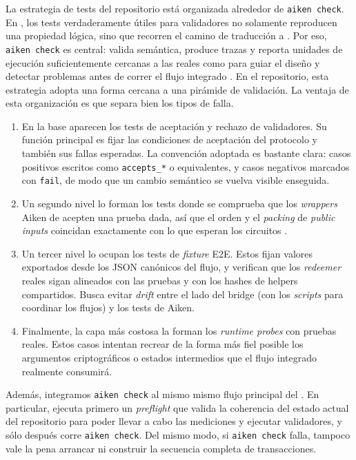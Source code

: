 La estrategia de tests del repositorio está organizada alrededor de \texttt{aiken check}. En \Cardano, los tests verdaderamente útiles para validadores no solamente reproducen una propiedad lógica, sino que recorren el camino de traducción a \UPLC. Por eso, \texttt{aiken check} es central: valida semántica, produce trazas y reporta unidades de ejecución suficientemente cercanas a las reales como para guiar el diseño y detectar problemas antes de correr el flujo integrado \cite{aiken2026}. En el repositorio, esta estrategia adopta una forma cercana a una pirámide de validación. La ventaja de esta organización es que separa bien los tipos de falla.

\begin{enumerate}[noitemsep]
  \item En la base aparecen los tests de aceptación y rechazo de validadores. Su función principal es fijar las condiciones de aceptación del protocolo y también sus fallas esperadas. La convención adoptada es bastante clara: casos positivos escritos como \texttt{accepts\_*} o equivalentes, y casos negativos marcados con \texttt{fail}, de modo que un cambio semántico se vuelva visible enseguida.
  \item Un segundo nivel lo forman los tests donde se comprueba que los \textit{wrappers} Aiken de \Groth acepten una prueba dada, así que el orden y el \textit{packing} de \textit{public inputs} coincidan exactamente con lo que esperan los circuitos \Groth.
  \item Un tercer nivel lo ocupan los tests de \textit{fixture} E2E. Estos fijan valores exportados desde los JSON canónicos del flujo, y verifican que los \textit{redeemer} reales sigan alineados con las pruebas y con los hashes de helpers compartidos. Busca evitar \textit{drift} entre el lado \Offchain del bridge (con los \textit{scripts} para coordinar los flujos) y los tests de Aiken.
  \item Finalmente, la capa más costosa la forman los \textit{runtime probes} con pruebas reales. Estos casos intentan recrear de la forma más fiel posible los argumentos criptográficos o estados intermedios que el flujo integrado realmente consumirá.
\end{enumerate}

Además, integramos \texttt{aiken check} al mismo mismo flujo principal del \zkBridge. En particular, \BridgeRunStrictCommand ejecuta primero un \textit{preflight} que valida la coherencia del estado actual del repositorio para poder llevar a cabo las mediciones y ejecutar validadores, y sólo después corre \texttt{aiken check}. Del mismo modo, si \texttt{aiken check} falla, tampoco vale la pena arrancar \Dolos ni construir la secuencia completa de transacciones.


